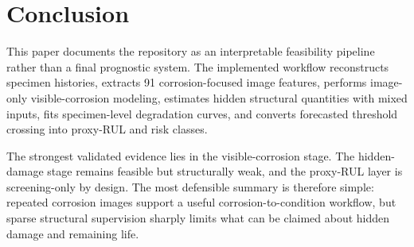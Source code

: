 \documentclass[conference]{IEEEtran}
\begin{document}
\section{Conclusion}
This paper documents the repository as an interpretable feasibility pipeline rather than a final prognostic system. The implemented workflow reconstructs specimen histories, extracts 91 corrosion-focused image features, performs image-only visible-corrosion modeling, estimates hidden structural quantities with mixed inputs, fits specimen-level degradation curves, and converts forecasted threshold crossing into proxy-RUL and risk classes.

The strongest validated evidence lies in the visible-corrosion stage. The hidden-damage stage remains feasible but structurally weak, and the proxy-RUL layer is screening-only by design. The most defensible summary is therefore simple: repeated corrosion images support a useful corrosion-to-condition workflow, but sparse structural supervision sharply limits what can be claimed about hidden damage and remaining life.
\end{document}
